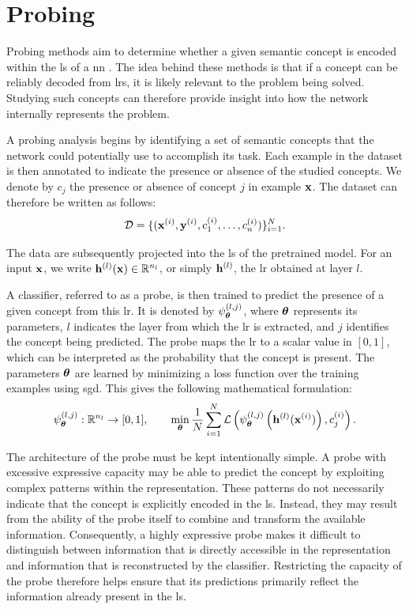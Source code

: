 \section{Probing}
\label{sec:latent_space_analysis_probing}

Probing methods aim to determine whether a given semantic concept is encoded within the \gls{ls} of a \gls{nn} \parencite{li2024emergentworldrepresentationsexploring, karvonen2024emergentworldmodelslatent}.
The idea behind these methods is that if a concept can be reliably decoded from \glspl{lr}, it is likely relevant to the problem being solved.
Studying such concepts can therefore provide insight into how the network internally represents the problem.

A probing analysis begins by identifying a set of semantic concepts that the network could potentially use to accomplish its task.
Each example in the dataset is then annotated to indicate the presence or absence of the studied concepts.
We denote by $c_j$ the presence or absence of concept $j$ in example $\mathbf{x}$.
The dataset can therefore be written as follows:
\[
\mathcal{D} = \{(\mathbf{x}^{(i)}, \mathbf{y}^{(i)}, c^{(i)}_1, \dots, c^{(i)}_n)\}_{i=1}^{N}.
\]

The data are subsequently projected into the \gls{ls} of the pretrained model.
For an input $\mathbf{x}$, we write $\latentRepresentation[l](\vect{x}) \in \mathbb{R}^{n_l}$, or simply $\latentRepresentation[l]$, the \gls{lr} obtained at layer $l$.

A classifier, referred to as a probe, is then trained to predict the presence of a given concept from this \gls{lr}.
It is denoted by $\psi^{(l,j)}_{\boldsymbol{\theta}}$, where $\boldsymbol{\theta}$ represents its parameters, $l$ indicates the layer from which the \gls{lr} is extracted, and $j$ identifies the concept being predicted.
The probe maps the \gls{lr} to a scalar value in $[0,1]$, which can be interpreted as the probability that the concept is present.
The parameters $\boldsymbol{\theta}$ are learned by minimizing a loss function over the training examples using \gls{sgd}.
This gives the following mathematical formulation:
\begin{equation}
\Probe{l}{j} : \mathbb{R}^{n_l} \rightarrow [0,1],
\qquad
\min_{\params} \frac{1}{N} \sum_{i=1}^{N}
\mathcal{L}\left(
\Probe{l}{j}\left(\latentRepresentation[l](\vect{x}^{(i)})\right),
c_j^{(i)}
\right).
\label{eq:probe_function}
\end{equation}

The architecture of the probe must be kept intentionally simple.
A probe with excessive expressive capacity may be able to predict the concept by exploiting complex patterns within the representation.
These patterns do not necessarily indicate that the concept is explicitly encoded in the \gls{ls}.
Instead, they may result from the ability of the probe itself to combine and transform the available information.
Consequently, a highly expressive probe makes it difficult to distinguish between information that is directly accessible in the representation and information that is reconstructed by the classifier.
Restricting the capacity of the probe therefore helps ensure that its predictions primarily reflect the information already present in the \gls{ls}.

